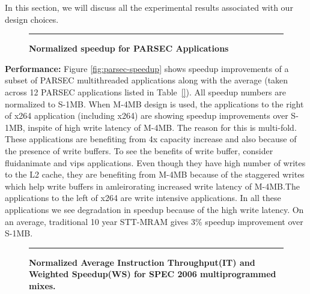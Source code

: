 In this section, we will discuss all the experimental results associated with our design choices.



\begin{figure*} [t]
\centering
 \hrule
 \caption{\label{fig:parsec-new} \scriptsize \bf Normalized speedup for PARSEC Applications }
\end{figure*}



\noindent\textbf {Performance:} Figure \ref{fig:parsec-speedup} shows speedup improvements of a subset of PARSEC 
multithreaded applications along with the average (taken across 12 PARSEC applications listed in Table~\ref{}). 
All speedup numbers are normalized to S-1MB. When M-4MB design is used, the applications to the right of x264 application (including x264) are
showing speedup improvements over S-1MB, inspite of high write latency of M-4MB.
The reason for this is multi-fold. These applications are benefiting from 4x capacity increase and also 
because of the presence of write buffers. To see the benefits of write buffer, 
consider fluidanimate and vips applications. Even though they have high number of writes to the L2 cache, 
they are benefiting from M-4MB because of the staggered writes which help write buffers in amleirorating increased write latency
of M-4MB.The applications to the left of x264 are write intensive applications. In all these applications we see degradation in speedup
because of the high write latency.  On an average, traditional 10 year STT-MRAM gives 3\% speedup improvement over S-1MB.



\begin{figure*} [t]
\centering
 \hrule
 \caption{\label{fig:spec-new} \scriptsize \bf Normalized Average Instruction Throughput(IT) and Weighted Speedup(WS) for SPEC 2006 multiprogrammed mixes. }
\end{figure*}


